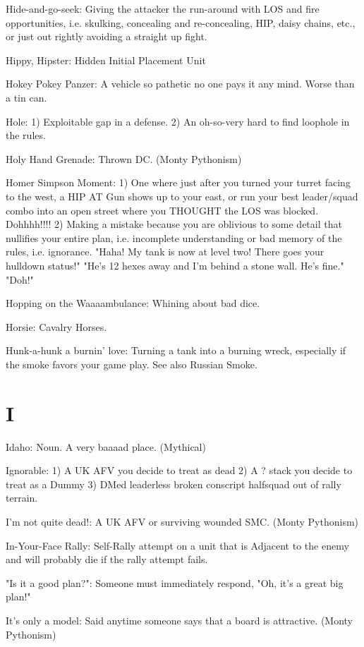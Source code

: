 \documentclass[letterpaper]{article}
\begin{document}
Hide-and-go-seek: Giving the attacker the run-around with LOS and fire opportunities, i.e. skulking, concealing and re-concealing, HIP, daisy chains, etc., or just out rightly avoiding a straight up fight.

Hippy, Hipster: Hidden Initial Placement Unit

Hokey Pokey Panzer: A vehicle so pathetic no one pays it any mind. Worse than a tin can.

Hole: 1) Exploitable gap in a defense. 2) An oh-so-very hard to find loophole in the rules.

Holy Hand Grenade: Thrown DC. (Monty Pythonism)

Homer Simpson Moment: 1) One where just after you turned your turret facing to
the west, a HIP AT Gun shows up to your east, or run your best leader/squad
combo into an open street where you THOUGHT the LOS was blocked. Dohhhh!!!! 2) Making a mistake because you are oblivious to some detail that nullifies your entire plan, i.e. incomplete understanding or bad memory of the rules, i.e. ignorance. "Haha! My tank is now at level two! There goes your hulldown status!" "He's 12 hexes away and I'm behind a stone wall. He's fine." "Doh!"

Hopping on the Waaaambulance:  Whining about bad dice.

Horsie: Cavalry Horses.

Hunk-a-hunk a burnin' love: Turning a tank into a burning wreck, especially if the smoke favors your game play. See also Russian Smoke.

\section{I}

Idaho: Noun. A very baaaad place. (Mythical)

Ignorable: 1) A UK AFV you decide to treat as dead 2) A ? stack you decide to treat as a Dummy 3) DMed leaderless broken conscript halfsquad out of rally terrain.

I'm not quite dead!: A UK AFV or surviving wounded SMC. (Monty Pythonism)

In-Your-Face Rally: Self-Rally attempt on a unit that is Adjacent to the enemy and will probably die if the rally attempt fails.

"Is it a good plan?": Someone must immediately respond, "Oh, it's a great big plan!"

It's only a model: Said anytime someone says that a board is attractive. (Monty Pythonism)
\end{document}
